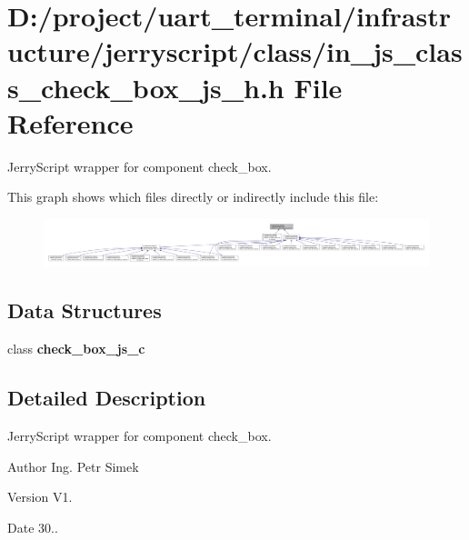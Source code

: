 \section{D\+:/project/uart\+\_\+terminal/infrastructure/jerryscript/class/in\+\_\+js\+\_\+class\+\_\+check\+\_\+box\+\_\+js\+\_\+h.h File Reference}
\label{in__js__class__check__box__js__h_8h}


Jerry\+Script wrapper for component check\+\_\+box.  


This graph shows which files directly or indirectly include this file\+:
\nopagebreak
\begin{figure}[H]
\begin{center}
\leavevmode
\includegraphics[width=350pt]{in__js__class__check__box__js__h_8h__dep__incl}
\end{center}
\end{figure}
\subsection*{Data Structures}
\begin{DoxyCompactItemize}
\item 
class \textbf{ check\+\_\+box\+\_\+js\+\_\+c}
\end{DoxyCompactItemize}


\subsection{Detailed Description}
Jerry\+Script wrapper for component check\+\_\+box. 

\begin{DoxyAuthor}{Author}
Ing. Petr Simek 
\end{DoxyAuthor}
\begin{DoxyVersion}{Version}
V1. 
\end{DoxyVersion}
\begin{DoxyDate}{Date}
30.. 
\end{DoxyDate}
